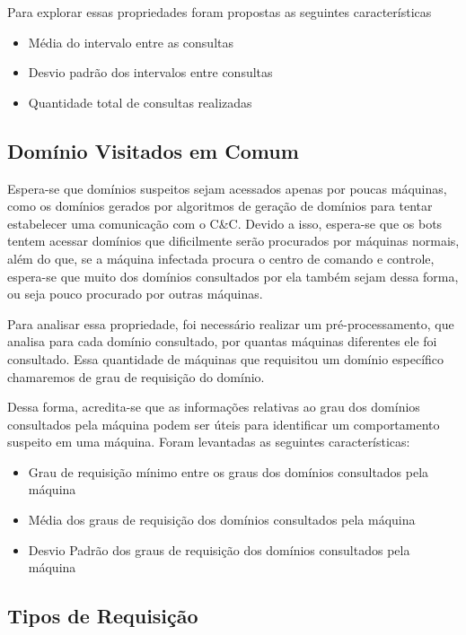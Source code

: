 Para explorar essas propriedades foram propostas as seguintes características 

\begin{itemize}
\item Média do intervalo entre as consultas
\item Desvio padrão dos intervalos entre consultas
\item Quantidade total de consultas realizadas
\end{itemize}

\subsection{Domínio Visitados em Comum}
Espera-se que domínios suspeitos sejam acessados apenas por poucas máquinas, como os domínios gerados por algoritmos de geração de domínios para tentar estabelecer uma comunicação com o C\&C. Devido a isso, espera-se que os bots tentem acessar domínios que dificilmente serão procurados por máquinas normais, além do que, se a máquina infectada procura o centro de comando e controle, espera-se que muito dos domínios consultados por ela também sejam dessa forma, ou seja pouco procurado por outras máquinas.

Para analisar essa propriedade, foi necessário realizar um pré-processamento, que analisa para cada domínio consultado, por quantas máquinas diferentes ele foi consultado. Essa quantidade de máquinas que requisitou um domínio específico chamaremos de grau de requisição do domínio.

Dessa forma, acredita-se que as informações relativas ao grau dos domínios consultados pela máquina podem ser úteis para identificar um comportamento suspeito em uma máquina. Foram levantadas as seguintes características:

\begin{itemize}
\item Grau de requisição mínimo entre os graus dos domínios consultados pela máquina
\item Média dos graus de requisição dos domínios consultados pela máquina
\item Desvio Padrão dos graus de requisição dos domínios consultados pela máquina

\end{itemize}

\subsection{Tipos de Requisição}

